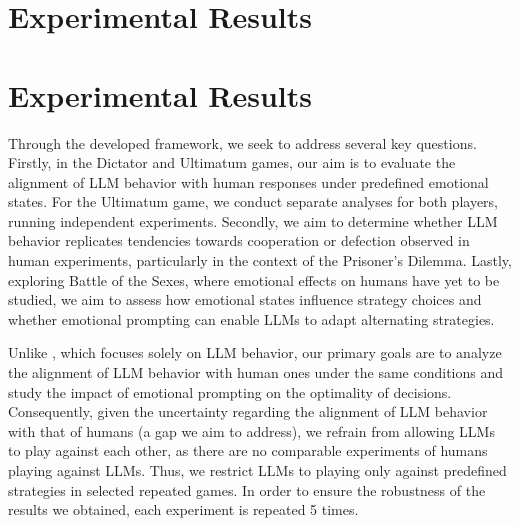 \documentclass{article}
\begin{document}
\section{Experimental Results}\label{sec:exp_results}



\section{Experimental Results}\label{sec:exp_results}



Through the developed framework, we seek to address several key questions. Firstly, in the Dictator and Ultimatum games, our aim is to evaluate the alignment of LLM behavior with human responses under predefined emotional states. For the Ultimatum game, we conduct separate analyses for both players, running independent experiments. Secondly, we aim to determine whether LLM behavior replicates tendencies towards cooperation or defection observed in human experiments, particularly in the context of the Prisoner's Dilemma. Lastly, exploring Battle of the Sexes, where emotional effects on humans have yet to be studied, we aim to assess how emotional states influence strategy choices and whether emotional prompting can enable LLMs to adapt alternating strategies. 

Unlike \cite{akata2023playing}, which focuses solely on LLM behavior, our primary goals are to analyze the alignment of LLM behavior with human ones under the same conditions and study the impact of emotional prompting on the optimality of decisions. Consequently, given the uncertainty regarding the alignment of LLM behavior with that of humans (a gap we aim to address), we refrain from allowing LLMs to play against each other, as there are no comparable experiments of humans playing against LLMs. Thus, we restrict LLMs to playing only against predefined strategies in selected repeated games. In order to ensure the robustness of the results we obtained, each experiment is repeated 5 times.
\end{document}
